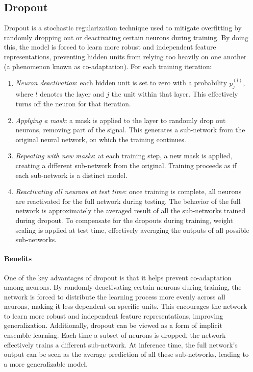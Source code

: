 \subsection{Dropout}
Dropout is a stochastic regularization technique used to mitigate overfitting by randomly dropping out or deactivating certain neurons during training. 
By doing this, the model is forced to learn more robust and independent feature representations, preventing hidden units from relying too heavily on one another (a phenomenon known as co-adaptation).
For each training iteration:
\begin{enumerate}
    \item \textit{Neuron deactivation}: each hidden unit is set to zero with a probability $p^{(l)}_j$, where $l$ denotes the layer and $j$ the unit within that layer. 
        This effectively turns off the neuron for that iteration.
    \item \textit{Applying a mask}: a mask is applied to the layer to randomly drop out neurons, removing part of the signal. 
        This generates a sub-network from the original neural network, on which the training continues.
    \item \textit{Repeating with new masks}: at each training step, a new mask is applied, creating a different sub-network from the original. 
        Training proceeds as if each sub-network is a distinct model.
    \item \textit{Reactivating all neurons at test time}: once training is complete, all neurons are reactivated for the full network during testing. 
        The behavior of the full network is approximately the averaged result of all the sub-networks trained during dropout. 
        To compensate for the dropouts during training, weight scaling is applied at test time, effectively averaging the outputs of all possible sub-networks.
\end{enumerate}
\paragraph*{Benefits}
One of the key advantages of dropout is that it helps prevent co-adaptation among neurons. 
By randomly deactivating certain neurons during training, the network is forced to distribute the learning process more evenly across all neurons, making it less dependent on specific units. 
This encourages the network to learn more robust and independent feature representations, improving generalization. 
Additionally, dropout can be viewed as a form of implicit ensemble learning. 
Each time a subset of neurons is dropped, the network effectively trains a different sub-network. 
At inference time, the full network's output can be seen as the average prediction of all these sub-networks, leading to a more generalizable model.

